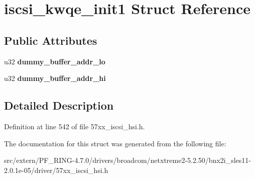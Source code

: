 \hypertarget{structiscsi__kwqe__init1}{
\section{iscsi\_\-kwqe\_\-init1 Struct Reference}
\label{structiscsi__kwqe__init1}
}
\subsection*{Public Attributes}
\begin{DoxyCompactItemize}
\item 
\hypertarget{structiscsi__kwqe__init1_abad5bf6a5aa37b0394e046c919f7a430}{
u32 {\bfseries dummy\_\-buffer\_\-addr\_\-lo}}
\label{structiscsi__kwqe__init1_abad5bf6a5aa37b0394e046c919f7a430}

\item 
\hypertarget{structiscsi__kwqe__init1_abf7c68581a2ae57364dcc8789ff848ec}{
u32 {\bfseries dummy\_\-buffer\_\-addr\_\-hi}}
\label{structiscsi__kwqe__init1_abf7c68581a2ae57364dcc8789ff848ec}

\end{DoxyCompactItemize}


\subsection{Detailed Description}


Definition at line 542 of file 57xx\_\-iscsi\_\-hsi.h.



The documentation for this struct was generated from the following file:\begin{DoxyCompactItemize}
\item 
src/extern/PF\_\-RING-\/4.7.0/drivers/broadcom/netxtreme2-\/5.2.50/bnx2i\_\-sles11-\/2.0.1e-\/05/driver/57xx\_\-iscsi\_\-hsi.h\end{DoxyCompactItemize}
